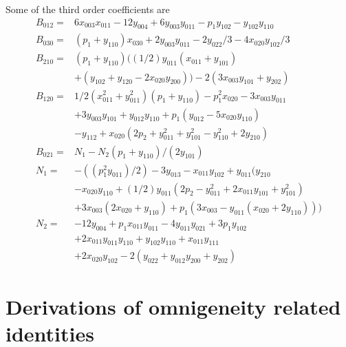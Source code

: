 \documentclass[aip,pop,reprint]{revtex4-1}
\begin{document}
\begin{appendices}
Some of the third order coefficients are
\begin{align}
    B_{012}=&6 x_{003} x_{011} - 12 y_{004} + 6 y_{003} y_{011} - p_1 y_{102} - y_{102} y_{110}\nonumber\\
    B_{030}= &(p_1+y_{110}) x_{030} + 2 y_{003} y_{011} - 2 y_{022}/3 - 4 x_{020} y_{102}/3  \nonumber\\
    B_{210}= & (p_1 + y_{110}) ((1/2)y_{011} (x_{011} + y_{101})\\
    &+ (y_{102} + y_{120} - 2 x_{020} y_{200})) - 2 (3 x_{003} y_{101} + y_{202})\nonumber \\
    B_{120}= &1/2 (x_{011}^2 + y_{011}^2) (p_1 + y_{110}) -p_1^2 x_{020} - 3 x_{003} y_{011}\nonumber\\
    & + 3 y_{003}  y_{101} + y_{012} y_{110} + p_1 (y_{012} - 5 x_{020} y_{110})\nonumber \\ & - y_{112}
 + x_{020} (2 p_2 + y_{011}^2 + y_{101}^2 - y_{110}^2 + 2 y_{210}) \nonumber\\
    B_{021}=& N_1- N_2(p_1 + y_{110})/(2 y_{101}) \nonumber\\
    N_1= & -((p_1^2 y_{011})/2) - 3 y_{013}- x_{011} y_{102} + 
 y_{011} ( y_{210}\nonumber\\&-x_{020} y_{110}+
 (1/2) y_{011} (2 p_2 - y_{011}^2 + 2 x_{011} y_{101} + y_{101}^2) \nonumber\\
 &+ 
 3 x_{003} (2 x_{020} + y_{110}) + p_1 (3 x_{003} - y_{011} (x_{020} + 2 y_{110})))\nonumber\\
    N_2= & -12 y_{004} + p_1 x_{011} y_{011} - 4 y_{011} y_{021} + 3 p_1 y_{102}  
\nonumber\\    &+ 
  2 x_{011} y_{011} y_{110} + y_{102} y_{110} + x_{011} y_{111}  \nonumber\\
  &+ 2 x_{020} y_{102}-2 (y_{022} + y_{012} y_{200} + y_{202})\nonumber
\end{align}


 \section{Derivations of omnigeneity related identities \label{appendix C}}

\end{appendices}
\end{document}
